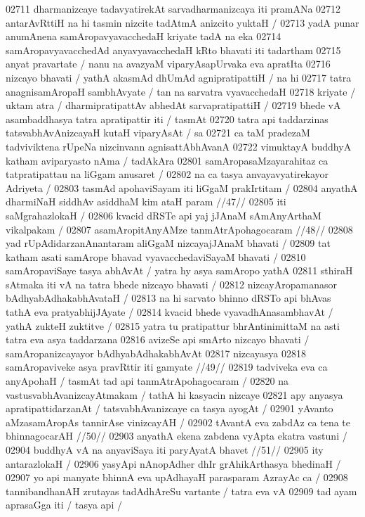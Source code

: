 02711 dharmanizcaye tadavyatirekAt sarvadharmanizcaya iti pramANa  
02712 antarAvRttiH na hi tasmin nizcite tadAtmA anizcito yuktaH /  
02713 yadA punar anumAnena samAropavyavacchedaH kriyate tadA na eka 
02714 samAropavyavacchedAd anyavyavacchedaH kRto bhavati iti tadartham  
02715 anyat pravartate / nanu na avazyaM viparyAsapUrvaka eva apratIta  
02716 nizcayo bhavati / yathA akasmAd dhUmAd agnipratipattiH / na hi 
02717 tatra anagnisamAropaH sambhAvyate / tan na sarvatra vyavacchedaH 
02718 kriyate / uktam atra / dharmipratipattAv abhedAt sarvapratipattiH /
02719 bhede vA asambaddhasya tatra apratipattir iti / tasmAt
02720 tatra api taddarzinas tatsvabhAvAnizcayaH kutaH viparyAsAt / sa 
02721 ca taM pradezaM tadviviktena rUpeNa nizcinvann agnisattAbhAvanA
02722 vimuktayA buddhyA katham aviparyasto nAma / tadAkAra
02801 samAropasaMzayarahitaz ca tatpratipattau na liGgam anusaret /
02802 na ca tasya anvayavyatirekayor Adriyeta / 
02803 	tasmAd apohaviSayam iti liGgaM prakIrtitam / 
02804 	anyathA dharmiNaH siddhAv asiddhaM kim ataH param //47//  
02805 iti saMgrahazlokaH /
02806 	kvacid dRSTe api yaj jJAnaM sAmAnyArthaM vikalpakam /  
02807 	asamAropitAnyAMze tanmAtrApohagocaram //48//
02808 yad rUpAdidarzanAnantaram aliGgaM nizcayajJAnaM bhavati /  
02809 tat katham asati samArope bhavad vyavacchedaviSayaM bhavati /  
02810 samAropaviSaye tasya abhAvAt / yatra hy asya samAropo yathA
02811 sthiraH sAtmaka iti vA na tatra bhede nizcayo bhavati /  
02812 	nizcayAropamanasor bAdhyabAdhakabhAvataH /  
02813 na hi sarvato bhinno dRSTo api bhAvas tathA eva pratyabhijJAyate /  
02814 kvacid bhede vyavadhAnasambhavAt / yathA zukteH zuktitve /
02815 yatra tu pratipattur bhrAntinimittaM na asti tatra eva asya taddarzana
02816 avizeSe api smArto nizcayo bhavati / samAropanizcayayor bAdhyabAdhakabhAvAt
02817 nizcayasya 
02818 	samAropaviveke asya pravRttir iti gamyate //49// 
02819 tadviveka eva ca anyApohaH / tasmAt tad api tanmAtrApohagocaram / 
02820 na vastusvabhAvanizcayAtmakam / tathA hi kasyacin nizcaye 
02821 apy anyasya apratipattidarzanAt / tatsvabhAvanizcaye ca tasya ayogAt /
02901 	yAvanto aMzasamAropAs tannirAse vinizcayAH /
02902 	tAvantA eva zabdAz ca tena te bhinnagocarAH //50//  
02903 	anyathA ekena zabdena vyApta ekatra vastuni / 
02904 	buddhyA vA na anyaviSaya iti paryAyatA bhavet //51//
02905 ity antarazlokaH /  
02906 	yasyApi nAnopAdher dhIr grAhikArthasya bhedinaH /
02907 yo api manyate bhinnA eva upAdhayaH parasparam AzrayAc ca /  
02908 tannibandhanAH zrutayas tadAdhAreSu vartante / tatra eva vA
02909 tad ayam aprasaGga iti / tasya api /  
